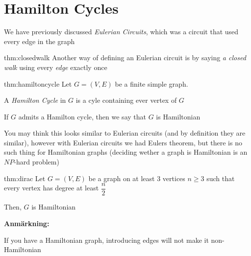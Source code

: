 \section{Hamilton Cycles}
\par\bigskip
\noindent We have previously discussed \textit{Eulerian Circuits}, which was a circuit that used every edge in the graph
\par\bigskip
\begin{theo}{thm:closedwalk}
  Another way of defining an Eulerian circuit is by saying \textit{a closed walk} using every \textit{edge} exactly once
\end{theo}
\par\bigskip
\begin{theo}{thm:hamiltoncycle}
  Let $G = (V,E)$ be a finite simple graph.
  \par\bigskip
  \noindent A \textit{Hamilton Cycle} in $G$ is a cyle containing ever vertex of $G$
  \par\bigskip
  \noindent If $G$ admits a Hamilton cycle, then we say that $G$ is Hamiltonian 
\end{theo}
\par\bigskip
\noindent You may think this looks similar to Eulerian circuits (and by definition they are similar), however with Eulerian circuits we had Eulers theorem, but there is no such thing for Hamiltonian graphs (deciding wether a graph is Hamiltonian is an $NP$-hard problem)
\par\bigskip
\begin{theo}[Dirac]{thm:dirac}
  Let $G = (V,E)$ be a graph on at least 3 vertices $n\geq3$ such that every vertex has degree at least $\dfrac{n}{2}$ 
  \par\bigskip
  \noindent Then, $G$ is Hamiltonian
\end{theo}
\par\bigskip
\noindent\textbf{Anmärkning:}\par
\noindent If you have a Hamiltonian graph, introducing edges will not make it non-Hamiltonian
\par\bigskip
